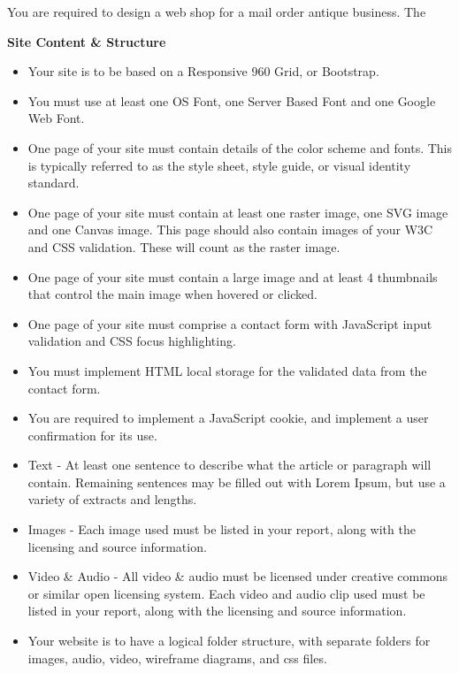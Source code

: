 You are required to design a web shop for a mail order antique business. The  





\vspace{.5cm}

\textbf{Site Content \& Structure}\\

\begin{itemize}
	\item Your site is to be based on a Responsive 960 Grid, or Bootstrap.
	\item You must use at least one OS Font, one Server Based Font and one Google Web Font.
	\item One page of your site must contain details of the color scheme and fonts. This is typically referred to as the style sheet, style guide, or visual identity standard. 
	\item One page of your site must contain at least one raster image, one SVG image and one Canvas image.  This page should also contain images of your W3C and CSS validation.  These will count as the raster image.
	\item One page of your site must contain a large image and at least 4 thumbnails that control the main image when hovered or clicked.
	\item One page of your site must comprise a contact form with JavaScript input validation and CSS focus highlighting.
	\item You must implement HTML local storage for the validated data from the contact form.
	\item You are required to implement a JavaScript cookie, and implement a user confirmation for its use. 
	\item Text - At least one sentence to describe what the article or paragraph will contain.  Remaining sentences may be filled out with Lorem Ipsum, but use a variety of extracts and lengths.
	\item Images - Each image used must be listed in your report, along with the licensing and source information.   
	\item Video \& Audio - All video \& audio must be licensed under creative commons or similar open licensing system.  Each video and audio clip used must be listed in your report, along with the licensing and source information.
	\item Your website is to have a logical folder structure, with separate folders for images, audio, video, wireframe diagrams, and css files. 
\end{itemize}


